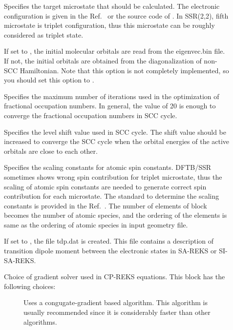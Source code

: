 \begin{description}
\item[] Specifies the target microstate that should be calculated. The electronic
  configuration is given in the Ref.~\cite{Lee_JCTC_2019} or the source code of \dftbp{}. In SSR(2,2),
  fifth microstate is triplet configuration, thus this microstate can be roughly considered as triplet state.

\item[] If set to , the initial molecular orbitals are read from the
  eigenvec.bin file. If not, the initial orbitals are obtained from the diagonalization of non-SCC Hamiltonian.
  Note that this option is not completely implemented, so you should set this option to .

\item[] Specifies the maximum number of iterations used in the optimization of
  fractional occupation numbers. In general, the value of 20 is enough to converge the fractional
  occupation numbers in SCC cycle.

\item[] Specifies the level shift value used in SCC cycle. The shift value should be increased
  to converge the SCC cycle when the orbital energies of the active orbitals are close to each other.

\item[] Specifies the scaling constants for atomic spin constants. DFTB/SSR sometimes
  shows wrong spin contribution for triplet microstate, thus the scaling of atomic spin constants are needed
  to generate correct spin contribution for each microstate. The standard to determine the scaling constants
  is provided in the Ref.~\cite{Lee_JCTC_2019}. The number of elements of  block becomes the number of
  atomic species, and the ordering of the elements is same as the ordering of atomic species in input geometry file.

\item[] If set to , the file tdp.dat is created. This file contains a
  description of transition dipole moment between the electronic states in SA-REKS or SI-SA-REKS.

\item[] Choice of gradient solver used in CP-REKS equations. This  block has the following choices:

  \begin{description} 
  \item[] Uses a congugate-gradient based algorithm. This
    algorithm is usually recommended since it is considerably faster than other algorithms.
    

\end{description}
\end{description}
